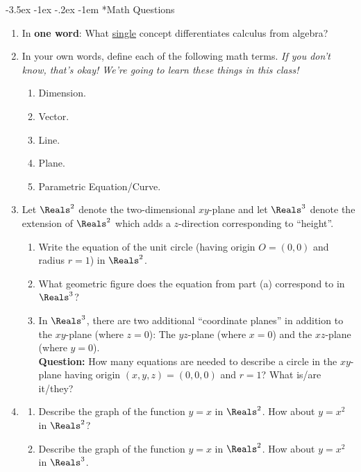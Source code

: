 \documentclass[12pt]{article}
\makeatletter
\newcommand{\ti}[1]{\textit{#1}}
\newcommand{\tb}[1]{\textbf{#1}}
\renewcommand\subsubsection{\@startsection {subsubsection}{1}{\z@}%
	{-3.5ex \@plus -1ex \@minus -.2ex}%
	{-1em}%
	{\normalfont\bfseries\hspace{-0.5in}}}
\makeatother
\begin{document}
\newpage

\subsubsection*{Math Questions}
\begin{enumerate}[resume]
	\item In \textbf{one word}: What \ul{single} concept differentiates calculus from algebra?
	
	\item In your own words, define each of the following math terms. \ti{If you don't know, that's okay! We're going to learn these things in this class!}
	\begin{enumerate}[itemsep=0.3275in]
		\item Dimension.
		\item Vector.
		\item Line.
		\item Plane.
		\item Parametric Equation/Curve.
	\end{enumerate}

	\item Let $\Reals^2$ denote the two-dimensional $xy$-plane and let $\Reals^3$ denote the extension of $\Reals^2$ which adds a $z$-direction corresponding to ``height''.
		\begin{enumerate}[itemsep=0.25in]
			\item Write the equation of the unit circle (having origin $O=(0,0)$ and radius $r=1$) in $\Reals^2$.
			\item What geometric figure does the equation from part (a) correspond to in $\Reals^3$?
			\item In $\Reals^3$, there are two additional ``coordinate planes'' in addition to the $xy$-plane (where $z=0$): The $yz$-plane (where $x=0$) and the $xz$-plane (where $y=0$).\\
			
			\tb{Question:} How many equations are needed to describe a circle in the $xy$-plane having origin $(x,y,z)=(0,0,0)$ and $r=1$? What is/are it/they?
		\end{enumerate}
	
	\item
	\begin{enumerate}[itemsep=0.375in]
		\item Describe the graph of the function $y=x$ in $\Reals^2$. How about $y=x^2$ in $\Reals^2$?
		\item Describe the graph of the function $y=x$ in $\Reals^2$. How about $y=x^2$ in $\Reals^3$.
	\end{enumerate}


\end{enumerate}
\end{document}
